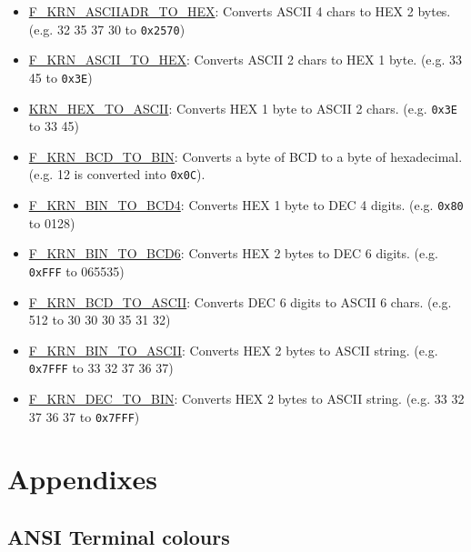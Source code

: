\documentclass[a4paper,11pt]{article}
\begin{document}
    \begin{itemize}
        \item \hyperref[func:fkrnasciiadrtohex]{F\_KRN\_ASCIIADR\_TO\_HEX}:
        Converts ASCII 4 chars to HEX 2 bytes. (e.g. 32 35 37 30 to \texttt{0x2570})
        \item \hyperref[func:fkrnasciitohex]{F\_KRN\_ASCII\_TO\_HEX}: Converts
        ASCII 2 chars to HEX 1 byte. (e.g. 33 45 to \texttt{0x3E})
        \item \hyperref[func:fkrnhextoascii]{KRN\_HEX\_TO\_ASCII}: Converts
        HEX 1 byte to ASCII 2 chars. (e.g. \texttt{0x3E} to 33 45)
        \item \hyperref[func:fkrnbcdtobin]{F\_KRN\_BCD\_TO\_BIN}: Converts a
        byte of BCD to a byte of hexadecimal. (e.g. 12 is converted into \texttt{0x0C}).
        \item \hyperref[func:fkrnbintobcd4]{F\_KRN\_BIN\_TO\_BCD4}: Converts HEX
        1 byte to DEC 4 digits. (e.g. \texttt{0x80} to 0128)
        \item \hyperref[func:fkrnbintobcd6]{F\_KRN\_BIN\_TO\_BCD6}: Converts HEX
        2 bytes to DEC 6 digits. (e.g. \texttt{0xFFF} to 065535)
        \item \hyperref[func:fkrnbcdtoascii]{F\_KRN\_BCD\_TO\_ASCII}: Converts
        DEC 6 digits to ASCII 6 chars. (e.g. 512 to 30 30 30 35 31 32)
        \item \hyperref[func:fkrnbintoascii]{F\_KRN\_BIN\_TO\_ASCII}: Converts
        HEX 2 bytes to ASCII string. (e.g. \texttt{0x7FFF} to 33 32 37 36 37)
        \item \hyperref[func:fkrndectobin]{F\_KRN\_DEC\_TO\_BIN}:
        Converts HEX 2 bytes to ASCII string. (e.g. 33 32 37 36 37 to
        \texttt{0x7FFF})
    \end{itemize}

    \pagebreak
    \section{Appendixes}
    \label{sec:appendixes}

    \subsection{ANSI Terminal colours}
\end{document}
